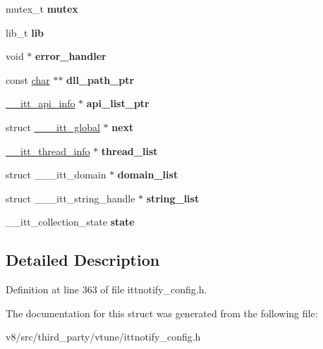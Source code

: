 \begin{DoxyCompactItemize}
mutex\+\_\+t {\bfseries mutex}
\item 
\mbox{\label{struct______itt__global_acd607182b03ee49400b6a4ffa69ae5db}} 
lib\+\_\+t {\bfseries lib}
\item 
\mbox{\label{struct______itt__global_a5218b05dd00a757cd30e4a324d5a0305}} 
void $\ast$ {\bfseries error\+\_\+handler}
\item 
\mbox{\label{struct______itt__global_a809581305da5391f26bd268673155ec7}} 
const \mbox{\hyperlink{classchar}{char}} $\ast$$\ast$ {\bfseries dll\+\_\+path\+\_\+ptr}
\item 
\mbox{\label{struct______itt__global_aad92b41f5e69bea276e464b4037d0b95}} 
\mbox{\hyperlink{struct______itt__api__info}{\+\_\+\+\_\+itt\+\_\+api\+\_\+info}} $\ast$ {\bfseries api\+\_\+list\+\_\+ptr}
\item 
\mbox{\label{struct______itt__global_ab664cd3d54752490af7e535d27d44763}} 
struct \mbox{\hyperlink{struct______itt__global}{\+\_\+\+\_\+\+\_\+itt\+\_\+global}} $\ast$ {\bfseries next}
\item 
\mbox{\label{struct______itt__global_aa28553355cdc4eb4f7a51911f15ea938}} 
\mbox{\hyperlink{struct______itt__thread__info}{\+\_\+\+\_\+itt\+\_\+thread\+\_\+info}} $\ast$ {\bfseries thread\+\_\+list}
\item 
\mbox{\label{struct______itt__global_a0eb1e7fa6a1bfd35ec682a3998aae7b6}} 
struct \+\_\+\+\_\+\+\_\+itt\+\_\+domain $\ast$ {\bfseries domain\+\_\+list}
\item 
\mbox{\label{struct______itt__global_ab2f78024685f31d524cf848564bb24da}} 
struct \+\_\+\+\_\+\+\_\+itt\+\_\+string\+\_\+handle $\ast$ {\bfseries string\+\_\+list}
\item 
\mbox{\label{struct______itt__global_af2a97fb07952dc430a28042e12732532}} 
\+\_\+\+\_\+itt\+\_\+collection\+\_\+state {\bfseries state}
\end{DoxyCompactItemize}


\subsection{Detailed Description}


Definition at line 363 of file ittnotify\+\_\+config.\+h.



The documentation for this struct was generated from the following file\+:\begin{DoxyCompactItemize}
\item 
v8/src/third\+\_\+party/vtune/ittnotify\+\_\+config.\+h\end{DoxyCompactItemize}
